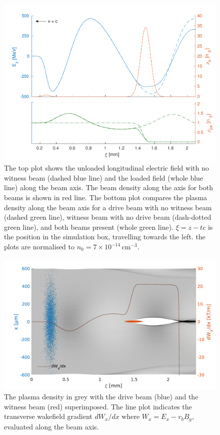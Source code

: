 \documentclass[aps,prstab,reprint,amsmath,amssymb,groupedaddress]{revtex4-1}
\newcommand{\unit}[1]{\,\mathrm{#1}}
\newcommand{\nexp}[1]{\times 10^{#1}}
\begin{document}
\begin{figure}[hbt]
    \includegraphics[width=\linewidth,trim={2mm 0mm 2mm 0mm},clip]{figures/beamLoading}
    \caption{\label{Fig:BeamLoading} The top plot shows the unloaded longitudinal electric field with no witness beam
        (dashed blue line) and the loaded field (whole blue line) along the beam axis. The beam density along the axis
        for both beams is shown in red line. The bottom plot compares the plasma density along the beam axis for a drive
        beam with no witness beam (dashed green line), witness beam with no drive beam (dash-dotted green line), and
        both beams present (whole green line). $\xi = z - tc$ is the position in the simulation box, travelling towards
        the left. the plots are normalised to $n_{0} = 7\nexp{-14}\unit{cm}^{-3}$.}
\end{figure}

\begin{figure}[hbt]
    \includegraphics[width=\linewidth,trim={2mm 0mm 2mm 0mm},clip]{figures/plasmaDenTWake}
    \caption{\label{Fig:PlasmaDenTWake} The plasma density in grey with the drive beam (blue) and the witness beam (red)
        superimposed. The line plot indicates the transverse wakefield gradient $dW_{x}/dx$ where
        $W_{x} = E_{x} - v_{b} B_{y}$, evaluated along the beam axis.}
\end{figure}
\end{document}
